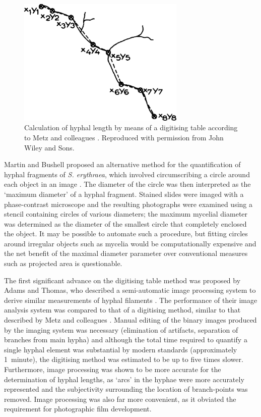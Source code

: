 \begin{figure}[t]
	\centering
	\includegraphics[width=8cm]{../C1/Fig2Metz1981}
	\caption{Calculation of hyphal length by means of a digitising table according to Metz and colleagues \cite{metz1981}. Reproduced with permission from John Wiley and Sons.}
	\label{fig:Fig2Metz1981}
\end{figure}


Martin and Bushell proposed an alternative method for the quantification of hyphal fragments of \emph{S. erythraea}, which involved circumscribing a circle around each object in an image \cite{martin1996}. The diameter of the circle was then interpreted as the \lq maximum diameter' of a hyphal fragment. Stained slides were imaged with a phase-contrast microscope and the resulting photographs were examined using a stencil containing circles of various diameters; the maximum mycelial diameter was determined as the diameter of the smallest circle that completely enclosed the object. It may be possible to automate such a procedure, but fitting circles around irregular objects such as mycelia would be computationally expensive and the net benefit of the maximal diameter parameter over conventional measures such as projected area is questionable.

The first significant advance on the digitising table method was proposed by Adams and Thomas, who described a semi-automatic image processing system to derive similar measurements of hyphal filaments \cite{adams1988}. The performance of their image analysis system was compared to that of a digitising method, similar to that described by Metz and colleagues \cite{metz1981}. Manual editing of the binary images produced by the imaging system was necessary (elimination of artifacts, separation of branches from main hypha) and although the total time required to quantify a single hyphal element was substantial by modern standards (approximately 1~minute), the digitising method was estimated to be up to five times slower. Furthermore, image processing was shown to be more accurate for the determination of hyphal lengths, as \lq arcs' in the hyphae were more accurately represented and the subjectivity surrounding the location of branch-points was removed. Image processing was also far more convenient, as it obviated the requirement for photographic film development.

